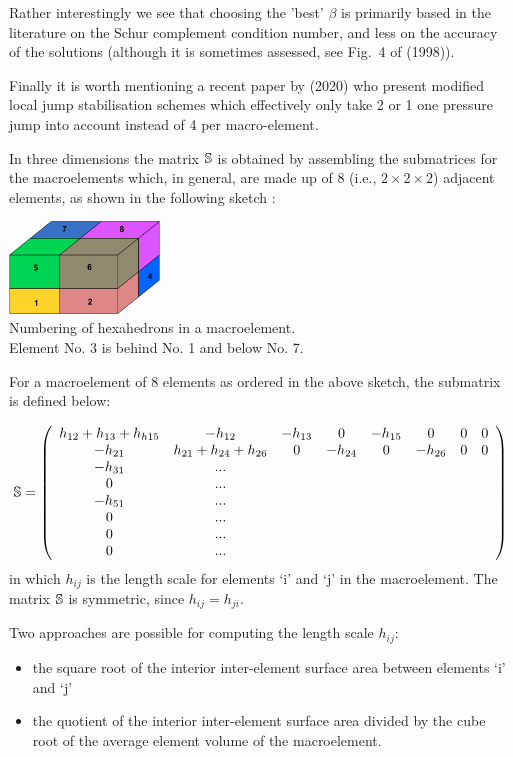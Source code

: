 Rather interestingly we see that choosing the 'best' $\beta$ is primarily based in the literature on the Schur complement condition number, and less on the accuracy of the solutions (although it is sometimes assessed, see Fig.~4 of \textcite{nosi98} (1998)). 

Finally it is worth mentioning a recent paper by \textcite{chke20} (2020) who present modified 
local jump stabilisation schemes which effectively 
only take 2 or 1 one pressure jump into account instead
of 4 per macro-element. 

\vspace{.5cm}
In  three dimensions the matrix ${\mathbb{S}}$ is obtained by assembling the submatrices 
for the macroelements which, in general, are made up of 8 (i.e., $2\times 2 \times 2$) 
adjacent elements, as shown in the following sketch \cite{chsu97}:

\begin{center}
\includegraphics[width=4cm]{images/q1p0stab/macro3D}\\
{\captionfont Numbering of hexahedrons in a macroelement.\\ 
Element No. 3 is behind No. 1 and below No. 7.} 
\end{center}

For a macroelement of 8 elements as ordered in the above sketch, the submatrix is defined below:

\[
{\mathbb{S}}=
\left(
\begin{array}{cccccccc}
h_{12}+h_{13}+h_{h15} & -h_{12} & -h_{13} &  0  &  -h_{15} & 0  & 0 & 0 \\
-h_{21} & h_{21}+h_{24} + h_{26} & 0 & -h_{24} & 0 & -h_{26} & 0 & 0 \\
-h_{31} & ... \\
0 & ... \\
-h_{51} & ...\\
0 & ...\\
0 & ...\\
0 & ...
\end{array}
\right)
\]
in which $h_{ij}$ is the length scale for elements `i' and `j' in the macroelement. 
The matrix ${\mathbb{S}}$ is symmetric, since $h_{ij}=h_{ji}$. 

Two approaches are possible  for computing the length scale $h_{ij}$:
\begin{itemize}
\item the square root of the interior inter-element surface area between elements `i' and `j' 
\item the quotient of the interior inter-element surface area divided by the cube 
root of the average element volume of the macroelement.
\end{itemize}


